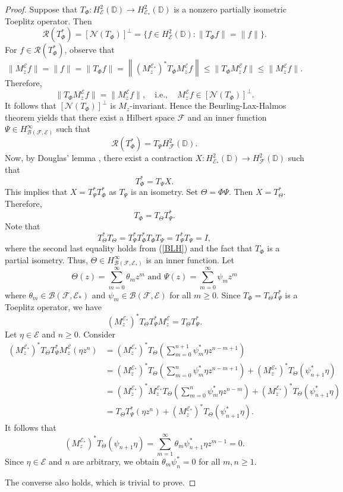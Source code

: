 \documentclass[12pt]{amsart}
\newcommand{\clb}{\mathcal{B}}
\newcommand{\cle}{\mathcal{E}}
\newcommand{\clf}{\mathcal{F}}
\newcommand{\cln}{\mathcal{N}}
\newcommand{\clr}{\mathcal{R}}
\newcommand{\D}{\mathbb{D}}
\theoremstyle{definition}
\theoremstyle{plain}
\theoremstyle{definition}
\numberwithin{equation}{section}
\begin{document}
\begin{proof}
Suppose that $T_\Phi: H^2_\cle(\D) \rightarrow H^2_{\cle_*}(\D)$ is a nonzero partially isometric Toeplitz operator. Then
\[
\clr(T_\Phi^*)=[\cln(T_\Phi)]^\perp=\{f \in H^2_{\cle}(\D):  \|T_\Phi f \|=\|f\|\}.
\]
For $f \in \clr(T_\Phi^*)$,  observe that
\[
	\|M_z^\cle f\|=\|f\|= \|T_\Phi f\|=\left\|(M_z^{\cle_*})^* T_\Phi M_z^\cle f\right\| \leq \|T_\Phi M_z^\cle f\| \leq \|M_z^\cle f\|. 
\]
Therefore, 
\[
\|T_\Phi M_z^\cle f\|=\|M_z^\cle f\|, \quad \text{i.e.}, \quad M_z^\cle f \in [\cln(T_\Phi)]^\perp.
\]
It follows that $[\cln(T_\Phi)]^\perp$ is $M_z$-invariant. Hence the Beurling-Lax-Halmos theorem yields that there exist a Hilbert space $\clf$ and an inner function $\Psi \in H^\infty_{\clb(\clf,\cle)}$ such that
\begin{equation}\label{BLH}
\clr(T_\Phi^*)= T_\Psi H^2_\clf(\D).
\end{equation}
Now, by Douglas' lemma \cite{RGD}, there exist a contraction $X : H^2_{\cle_*}(\D) \rightarrow H^2_{\clf}(\D)$ such that 
\[
T_\Phi^*=T_\Psi X.
\]
This implies that $X =T_\Psi^*T_\Phi^*$ as $T_\Psi$ is an isometry. Set 
$\Theta=\Phi \Psi$. Then $X= T_\Theta^*$. Therefore,
\[
T_\Phi=T_\Theta T_\Psi^*.
\]
Note that
\[
T_\Theta^*T_\Theta=T_\Psi^* T_\Phi^* T_\Phi T_\Psi= T_\Psi^* T_\Psi=I,
\]
where the second last equality holds from (\ref{BLH}) and the fact that $T_\Phi$ is a partial isometry. Thus, $\Theta\in H^\infty_{\clb(\clf, \cle_*)}$ is an inner function. 
Let 
\[
\Theta(z)=\sum\limits_{m=0}^\infty \theta_mz^m  \text{ and } \Psi(z)=\sum\limits_{m=0}^\infty \psi_mz^m
\]
where $\theta_m \in \clb(\clf,\cle_*)$ and $\psi_m \in \clb(\clf,\cle)$ for all $m \geq0$. Since $T_\Phi= T_\Theta T_\Psi^*$ is a Toeplitz operator, we have
\[
(M_z^{\cle_*})^*T_\Theta T_\Psi^* M_z^\cle=T_\Theta T_\Psi^*.
\]
Let $\eta \in \cle$ and $n \geq 0$. Consider
\begin{align*}
(M_z^{\cle_*})^*T_\Theta T_\Psi^* M_z^\cle(\eta z^n)&= (M_z^{\cle_*})^*T_\Theta\left(\sum\limits_{m=0}^{n+1} \psi_m^*\eta z^{n-m+1} \right )\\
&= (M_z^{\cle_*})^*T_\Theta\left(\sum\limits_{m=0}^n \psi_m^*\eta z^{n-m+1}\right) + (M_z^{\cle_*})^*T_\Theta(\psi_{n+1}^*\eta)\\
&=(M_z^{\cle_*})^*M_z^{\cle_*} T_\Theta\left(\sum\limits_{m=0}^n \psi_m^*\eta z^{n-m}\right) + (M_z^{\cle_*})^*T_\Theta(\psi_{n+1}^*\eta)\\
&=T_\Theta T_\Psi^*(\eta z^n) +(M_z^{\cle_*})^*T_\Theta(\psi_{n+1}^*\eta).
\end{align*}
It follows that 
\[
(M_z^{\cle_*})^*T_\Theta(\psi_{n+1} \eta)=\sum\limits_{m=1}^\infty \theta_m \psi_{n+1}^* \eta z^{m-1}=0.
\]
Since $\eta \in \cle$ and $n$ are arbitrary, we obtain $\theta_m \psi_n^*=0$ for all $m,n \geq 1$. 

The converse also holds, which is trivial to prove.
\end{proof}
\end{document}

